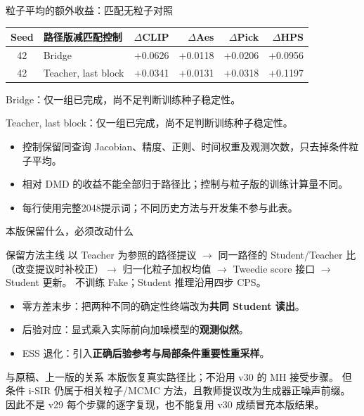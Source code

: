 \documentclass[10pt,aspectratio=169]{beamer}
\begin{document}
\begin{frame}{粒子平均的额外收益：匹配无粒子对照}
\scriptsize\centering
\begin{tabular}{clrrrr}\toprule
Seed & 路径版减匹配控制 & $\Delta$CLIP & $\Delta$Aes & $\Delta$Pick & $\Delta$HPS\\\midrule
42 & Bridge & +0.0626 & +0.0118 & +0.0206 & +0.0956 \\
42 & Teacher, last block & +0.0341 & +0.0131 & +0.0318 & +0.1197 \\
\bottomrule\end{tabular}\par\raggedright\vspace{5pt}
Bridge：仅一组已完成，尚不足判断训练种子稳定性。\par Teacher, last block：仅一组已完成，尚不足判断训练种子稳定性。
\begin{itemize}\itemsep4pt
\item 控制保留同查询 Jacobian、精度、正则、时间权重及观测次数，只去掉条件粒子平均。
\item 相对 DMD 的收益不能全部归于路径比；控制与粒子版的训练计算量不同。
\item 每行使用完整2048提示词；不同历史方法与开发集不参与此表。
\end{itemize}
\end{frame}


\begin{frame}{本版保留什么，必须改动什么}
\small
\begin{block}{保留方法主线}
以 Teacher 为参照的路径提议 $\to$ 同一路径的 Student/Teacher 比（改变提议时补校正）$\to$
归一化粒子加权均值 $\to$ Tweedie score 接口 $\to$ Student 更新。
不训练 Fake；Student 推理沿用四步 CPS。
\end{block}
\begin{itemize}\itemsep4pt
\item 零方差末步：把两种不同的确定性终端改为\textbf{共同 Student 读出}。
\item 后验对应：显式乘入实际前向加噪模型的\textbf{观测似然}。
\item ESS 退化：引入\textbf{正确后验参考与局部条件重要性重采样}。
\end{itemize}
\begin{alertblock}{与原稿、上一版的关系}
本版恢复真实路径比；不沿用 v30 的 MH 接受步骤。
但条件 i-SIR 仍属于相关粒子/MCMC 方法，且教师提议改为生成器正噪声前缀。
因此不是 v29 每个步骤的逐字复现，也不能复用 v30 成绩冒充本版结果。
\end{alertblock}
\end{frame}
\end{document}
